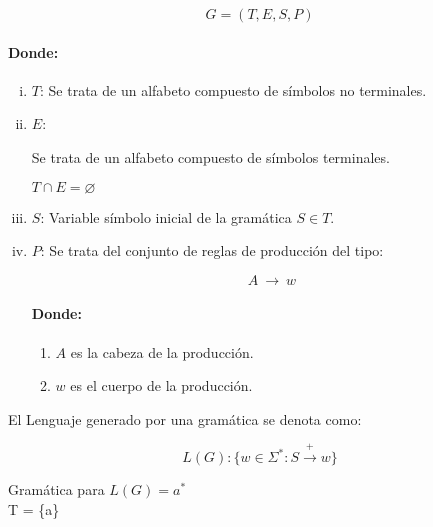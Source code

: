 \begin{equation}
G= (T, E, S, P)
\end{equation}

\paragraph*{Donde:}

\begin{enumerate}[i.]

\item $T$: Se trata de un alfabeto compuesto de símbolos no terminales.

\item $E$: {Se trata de un alfabeto compuesto de símbolos terminales.

\form $T \cap E = \varnothing$ 

}
\item $S$: Variable símbolo inicial de la gramática $S \in T$.

\item $P$: Se trata del conjunto de reglas de producción del tipo:

\begin{equation}
A\ {\longrightarrow}\ w
\end{equation}

\paragraph*{Donde:}

\begin{enumerate}

\item $A$ es la cabeza de la producción.

\item $w$ es el cuerpo de la producción.

\end{enumerate}



\end{enumerate}

 El Lenguaje generado por una gramática se denota como:

\begin{equation}
L(G): \{w \in \Sigma^*: S \stackrel{+}{\longrightarrow} w\}
\end{equation}

\ejem Gramática para $L(G) = a^*$ \\

T = \{a\} \\

